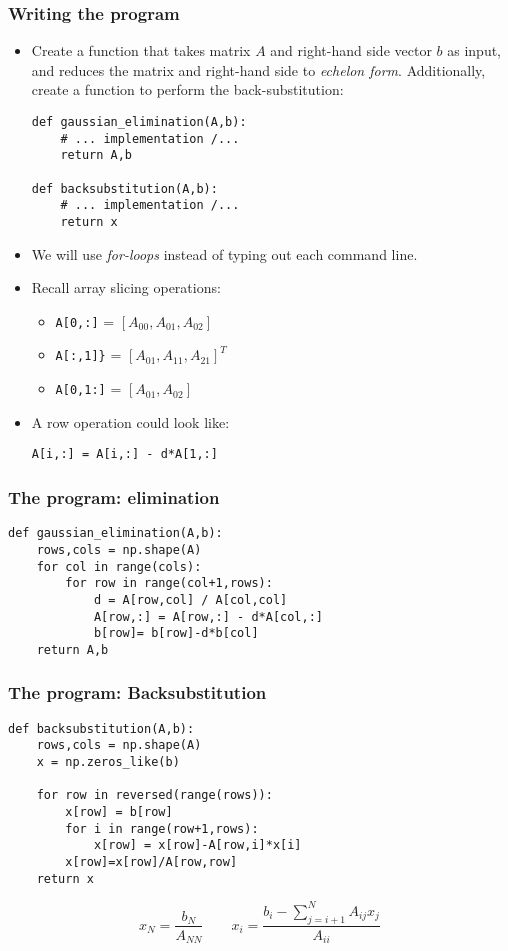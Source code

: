 \begin{frame}[fragile]
  \frametitle{Writing the program}
  \begin{itemize}
   \item Create a function that takes matrix $A$ and right-hand side vector $b$ as input, and reduces the matrix and right-hand side to \emph{echelon form}. Additionally, create a function to perform the back-substitution:
  \begin{lstlisting}
def gaussian_elimination(A,b):
    # ... implementation /...
    return A,b

def backsubstitution(A,b):
    # ... implementation /...
    return x
  \end{lstlisting}
  \item We will use \emph{for-loops} instead of typing out each command line.
  \item Recall array slicing operations:
  \begin{itemize}
  \item \lstinline$A[0,:]$   = $[A_{00}, A_{01}, A_{02}]$
  \item \lstinline$A[:,1]}$   = $[A_{01}, A_{11}, A_{21}]^T$
  \item \lstinline$A[0,1:]$ = $[A_{01}, A_{02}]$
  \end{itemize}
  \item A row operation could look like:
  \begin{lstlisting}
A[i,:] = A[i,:] - d*A[1,:]
  \end{lstlisting}
  \end{itemize}
\end{frame}

\begin{frame}[fragile]
  \frametitle{The program: elimination}
  \begin{lstlisting}
def gaussian_elimination(A,b):
    rows,cols = np.shape(A)
    for col in range(cols):
        for row in range(col+1,rows):
            d = A[row,col] / A[col,col]
            A[row,:] = A[row,:] - d*A[col,:]
            b[row]= b[row]-d*b[col]
    return A,b
  \end{lstlisting}
\end{frame}

\begin{frame}[fragile]
  \frametitle{The program: Backsubstitution}
  \begin{lstlisting}
def backsubstitution(A,b):
    rows,cols = np.shape(A)
    x = np.zeros_like(b)

    for row in reversed(range(rows)):
        x[row] = b[row]
        for i in range(row+1,rows):
            x[row] = x[row]-A[row,i]*x[i]
        x[row]=x[row]/A[row,row]
    return x
  \end{lstlisting}
  \[
     x_N = \frac{b_N}{A_{NN}} \qquad x_i = \frac{b_i - \sum_{j=i+1}^{N}A_{ij}x_j}{A_{ii}}
  \]
\end{frame}

